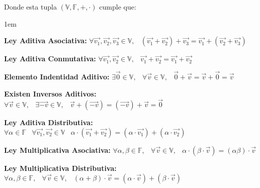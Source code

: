 \documentclass[12pt]{report}                                    %
\newenvironment{Indentation}[1][0.75em]                         %
    {\begin{adjustwidth}{#1}{}}                                     %
    {\end{adjustwidth}}                                             %
\DeclareMathOperator \Space {\quad}                             %
\DeclareMathOperator \MiniSpace {\;}                            %
\begin{document}
            Donde esta tupla $(\mathbb{V}, \mathbb{F}, +, \cdot)$ cumple que:
            \begin{Indentation}[1em]
            \begin{itemize}
            \small{
                
                \item 
                    \textbf{Ley Aditiva Asociativa:}
                    $\forall \vec{v_1}, \vec{v_2}, \vec{v_3} \in \mathbb{V}, \MiniSpace
                        (\vec{v_1} + \vec{v_2}) + \vec{v_3} = \vec{v_1} + (\vec{v_2} + \vec{v_3})$

                \item 
                    \textbf{Ley Aditiva Conmutativa:}
                    $\forall \vec{v_1}, \vec{v_2} \in \mathbb{V}, \MiniSpace
                            \vec{v_1} + \vec{v_2} = \vec{v_1} + \vec{v_2}$


                \item 
                    \textbf{Elemento Indentidad Aditivo:}
                    $\exists \vec{0} \in \mathbb{V}, \MiniSpace
                        \forall \vec{v} \in \mathbb{V}, \MiniSpace \vec{0} + \vec{v} = \vec{v} + \vec{0} = \vec{v}$

                \item 
                    \textbf{Existen Inversos Aditivos:}
                    $\forall \vec{v} \in \mathbb{V}, \MiniSpace
                            \exists \vec{-v} \in \mathbb{V}, \MiniSpace
                                \vec{v} + (\vec{-v}) = (\vec{-v}) + \vec{v} = \vec{0}$


                \item 
                    \textbf{Ley Aditiva Distributiva:}
                    $\forall \alpha \in \mathbb{F} \MiniSpace
                        \forall \vec{v_1}, \vec{v_2} \in \mathbb{V} \MiniSpace
                            \alpha \cdot (\vec{v_1} + \vec{v_2}) = 
                                (\alpha \cdot \vec{v_1}) + (\alpha \cdot \vec{v_2})$

                \item 
                    \textbf{Ley Multiplicativa Asociativa:}
                    $\forall \alpha, \beta \in \mathbb{F}, \MiniSpace
                        \forall \vec{v} \in \mathbb{V}, \MiniSpace
                            \alpha \cdot (\beta \cdot \vec{v}) = (\alpha \beta) \cdot \vec{v}$

                \item 
                    \textbf{Ley Multiplicativa Distributiva:}
                    $\forall \alpha, \beta \in \mathbb{F}, \MiniSpace
                        \forall \vec{v} \in \mathbb{V}, \MiniSpace
                            (\alpha + \beta) \cdot \vec{v} = 
                                    (\alpha \cdot \vec{v}) + (\beta \cdot \vec{v})$

}
\end{itemize}
\end{Indentation}
\end{document}
